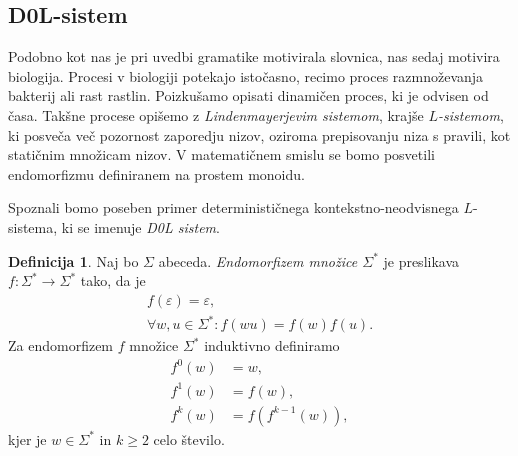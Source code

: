 \documentclass{amsart}
\theoremstyle{definition}
\newtheorem{definicija}{Definicija}[section]
\newtheorem{primer}[definicija]{Primer}
\theoremstyle{plain} %
\begin{document}

    

\subsection{D0L-sistem}

Podobno kot nas je pri uvedbi gramatike motivirala slovnica, nas sedaj motivira biologija. Procesi v biologiji
potekajo istočasno, recimo proces razmnoževanja bakterij ali rast rastlin. Poizkušamo opisati dinamičen proces, ki je odvisen od časa.
Takšne procese opišemo z \textit{Lindenmayerjevim sistemom}, krajše \textit{$ L $-sistemom}, ki posveča več pozornost zaporedju nizov,
oziroma prepisovanju niza s pravili, kot statičnim množicam nizov. V matematičnem smislu se bomo posvetili endomorfizmu
definiranem na prostem monoidu.

Spoznali bomo poseben primer determinističnega kontekstno-neodvisnega $ L $-sistema, ki se imenuje \textit{D0L sistem}.

\begin{definicija}
    
    Naj bo $ \Sigma $ abeceda. \textit{Endomorfizem množice $ \Sigma^* $} je preslikava $ f \colon \Sigma^* \to \Sigma^* $
    tako, da je
    \begin{gather*}
        f(\varepsilon) = \varepsilon, \\
        \forall w,u \in \Sigma^* \colon f(wu) = f(w)f(u).
    \end{gather*}
    Za endomorfizem $ f $ množice $ \Sigma^* $ induktivno definiramo
    \begin{align*}
        f^0(w) &= w, \\
        f^1(w) &= f(w), \\
        f^k(w) &= f(f^{k-1}(w)),
    \end{align*}
    kjer je $ w \in \Sigma^* $ in $ k \geq 2 $ celo število.

\end{definicija}
\end{document}

